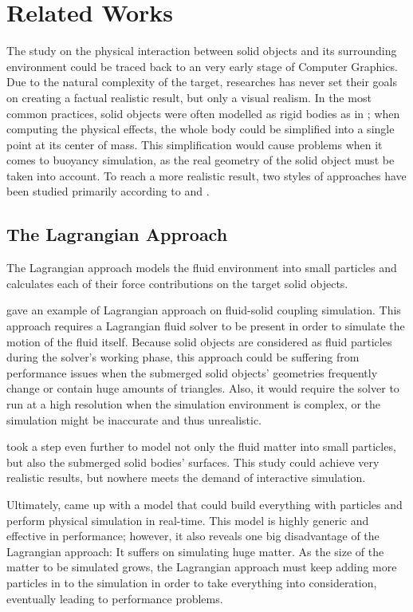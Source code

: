 \section{Related Works}

The study on the physical interaction between solid objects and its surrounding environment could be traced back to an very early stage of Computer Graphics.
Due to the natural complexity of the target, researches has never set their goals on creating a factual realistic result, but only a visual realism.
In the most common practices, solid objects were often modelled as rigid bodies as in \cite{BAR01}; when computing the physical effects, the whole body could be simplified into a single point at its center of mass.
This simplification would cause problems when it comes to buoyancy simulation, as the real geometry of the solid object must be taken into account.
To reach a more realistic result, two styles of approaches have been studied primarily according to \cite{GOU09} and \cite{wang2024physics}.

\subsection{The Lagrangian Approach}

The Lagrangian approach models the fluid environment into small particles and calculates each of their force contributions on the target solid objects.

\cite{CAR04} gave an example of Lagrangian approach on fluid-solid coupling simulation.
This approach requires a Lagrangian fluid solver to be present in order to simulate the motion of the fluid itself.
Because solid objects are considered as fluid particles during the solver's working phase, this approach could be suffering from performance issues when the submerged solid objects' geometries frequently change or contain huge amounts of triangles.
Also, it would require the solver to run at a high resolution when the simulation environment is complex, or the simulation might be inaccurate and thus unrealistic.

\cite{AKI12} took a step even further to model not only the fluid matter into small particles, but also the submerged solid bodies' surfaces.
This study could achieve very realistic results, but nowhere meets the demand of interactive simulation.

Ultimately, \cite{macklin2014unified} came up with a model that could build everything with particles and perform physical simulation in real-time.
This model is highly generic and effective in performance;
however, it also reveals one big disadvantage of the Lagrangian approach:
It suffers on simulating huge matter.
As the size of the matter to be simulated grows, the Lagrangian approach must keep adding more particles in to the simulation in order to take everything into consideration, eventually leading to performance problems.


